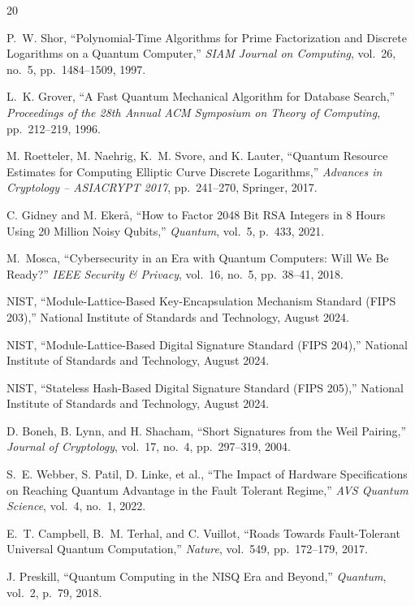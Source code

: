 \begin{thebibliography}{20}

P.~W. Shor, ``Polynomial-Time Algorithms for Prime Factorization and Discrete
Logarithms on a Quantum Computer,'' \emph{SIAM Journal on Computing}, vol.~26,
no.~5, pp.~1484--1509, 1997.

L.~K. Grover, ``A Fast Quantum Mechanical Algorithm for Database Search,''
\emph{Proceedings of the 28th Annual ACM Symposium on Theory of Computing},
pp.~212--219, 1996.

M. Roetteler, M. Naehrig, K.~M. Svore, and K. Lauter, ``Quantum Resource Estimates
for Computing Elliptic Curve Discrete Logarithms,'' \emph{Advances in Cryptology --
ASIACRYPT 2017}, pp.~241--270, Springer, 2017.

C. Gidney and M. Eker\aa, ``How to Factor 2048 Bit RSA Integers in 8 Hours Using
20 Million Noisy Qubits,'' \emph{Quantum}, vol.~5, p.~433, 2021.

M.~Mosca, ``Cybersecurity in an Era with Quantum Computers: Will We Be Ready?''
\emph{IEEE Security \& Privacy}, vol.~16, no.~5, pp.~38--41, 2018.

NIST, ``Module-Lattice-Based Key-Encapsulation Mechanism Standard (FIPS 203),''
National Institute of Standards and Technology, August 2024.

NIST, ``Module-Lattice-Based Digital Signature Standard (FIPS 204),''
National Institute of Standards and Technology, August 2024.

NIST, ``Stateless Hash-Based Digital Signature Standard (FIPS 205),''
National Institute of Standards and Technology, August 2024.

D. Boneh, B. Lynn, and H. Shacham, ``Short Signatures from the Weil Pairing,''
\emph{Journal of Cryptology}, vol.~17, no.~4, pp.~297--319, 2004.

S.~E. Webber, S. Patil, D. Linke, et al., ``The Impact of Hardware Specifications on
Reaching Quantum Advantage in the Fault Tolerant Regime,'' \emph{AVS Quantum Science},
vol.~4, no.~1, 2022.

E.~T. Campbell, B.~M. Terhal, and C. Vuillot, ``Roads Towards Fault-Tolerant Universal
Quantum Computation,'' \emph{Nature}, vol.~549, pp.~172--179, 2017.

J. Preskill, ``Quantum Computing in the NISQ Era and Beyond,'' \emph{Quantum},
vol.~2, p.~79, 2018.

\end{thebibliography}

